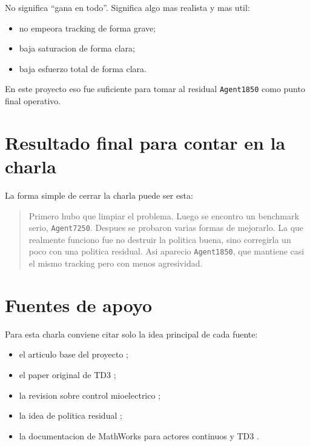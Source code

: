 \documentclass[11pt,a4paper]{article}
\begin{document}
No significa ``gana en todo''. Significa algo mas realista y mas util:
\begin{itemize}[leftmargin=1.5em]
\item no empeora tracking de forma grave;
\item baja saturacion de forma clara;
\item baja esfuerzo total de forma clara.
\end{itemize}

En este proyecto eso fue suficiente para tomar al residual \texttt{Agent1850} como punto final operativo.

\section{Resultado final para contar en la charla}

La forma simple de cerrar la charla puede ser esta:

\begin{quote}
Primero hubo que limpiar el problema. Luego se encontro un benchmark serio, \texttt{Agent7250}. Despues se probaron varias formas de mejorarlo. La que realmente funciono fue no destruir la politica buena, sino corregirla un poco con una politica residual. Asi aparecio \texttt{Agent1850}, que mantiene casi el mismo tracking pero con menos agresividad.
\end{quote}

\section{Fuentes de apoyo}

Para esta charla conviene citar solo la idea principal de cada fuente:
\begin{itemize}[leftmargin=1.5em]
\item el articulo base del proyecto \citep{fuertes2026continuous};
\item el paper original de TD3 \citep{fujimoto2018td3};
\item la revision sobre control mioelectrico \citep{chen2023review};
\item la idea de politica residual \citep{silver2018residual,schaff2020shared,resfit2025};
\item la documentacion de MathWorks para actores continuos y TD3 \citep{mathworks_td3_agent,mathworks_td3_options,mathworks_continuous_actor}.
\end{itemize}



\end{document}
